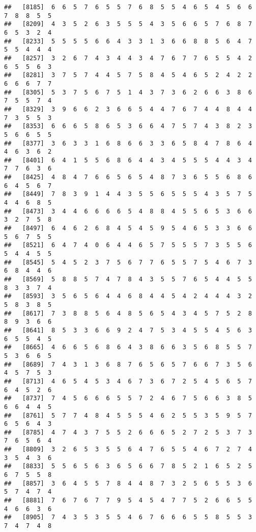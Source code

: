 \documentclass[
]{book}
\begin{document}
\begin{verbatim}
##   [8185]  6  6  5  7  6  5  5  7  6  8  5  5  4  6  5  4  5  6  6  7  8  8  5  5
##   [8209]  4  3  5  2  6  3  5  5  5  4  3  5  6  6  5  7  6  8  7  6  5  3  2  4
##   [8233]  5  5  5  5  6  6  4  3  3  1  3  6  6  8  8  5  6  4  7  5  5  4  4  4
##   [8257]  3  2  6  7  4  3  4  4  3  4  7  6  7  7  6  5  5  4  2  6  5  5  6  3
##   [8281]  3  7  5  7  4  4  5  7  5  8  4  5  4  6  5  2  4  2  2  6  6  6  7  7
##   [8305]  5  3  7  5  6  7  5  1  4  3  7  3  6  2  6  6  3  8  6  7  5  5  7  4
##   [8329]  3  9  6  6  2  3  6  6  5  4  4  7  6  7  4  4  8  4  4  7  3  5  5  3
##   [8353]  6  6  6  5  8  6  5  3  6  6  4  7  5  7  4  3  8  2  3  5  6  6  5  5
##   [8377]  3  6  3  3  1  6  8  6  6  3  3  6  5  8  4  7  8  6  4  4  6  3  6  2
##   [8401]  6  4  1  5  5  6  8  6  4  4  3  4  5  5  5  4  4  3  4  7  7  6  3  6
##   [8425]  4  8  4  7  6  6  5  6  5  4  8  7  3  6  5  5  6  8  6  6  4  5  6  7
##   [8449]  7  8  3  9  1  4  4  3  5  5  6  5  5  5  4  3  5  7  5  4  4  6  8  5
##   [8473]  3  4  4  6  6  6  6  5  4  8  8  4  5  5  6  5  3  6  6  3  2  7  5  8
##   [8497]  6  4  6  2  6  8  4  5  4  5  9  5  4  6  5  3  3  6  6  5  6  7  5  5
##   [8521]  6  4  7  4  0  6  4  4  6  5  7  5  5  5  7  3  5  5  6  5  4  4  5  5
##   [8545]  5  4  5  2  3  7  5  6  7  7  6  5  5  7  5  4  6  7  3  6  8  4  4  6
##   [8569]  5  8  8  5  7  4  7  8  4  3  5  5  7  6  5  4  4  5  5  8  3  3  7  4
##   [8593]  3  5  6  5  6  4  4  6  8  4  4  5  4  2  4  4  4  3  2  5  8  3  8  5
##   [8617]  7  3  8  8  5  6  4  8  5  6  5  4  3  4  5  7  5  2  8  8  9  3  6  6
##   [8641]  8  5  3  3  6  6  9  2  4  7  5  3  4  5  5  4  5  6  3  6  5  5  4  5
##   [8665]  4  6  6  5  6  8  6  4  3  8  6  6  3  5  6  8  5  5  7  5  3  6  6  5
##   [8689]  7  4  3  1  3  6  8  7  6  5  6  5  7  6  6  7  3  5  6  4  5  7  5  3
##   [8713]  4  6  5  4  5  3  4  6  7  3  6  7  2  5  4  5  6  5  7  6  4  5  2  6
##   [8737]  7  4  5  6  6  6  5  5  7  2  4  6  7  5  6  6  3  8  5  6  6  4  4  5
##   [8761]  5  7  7  4  8  4  5  5  5  4  6  2  5  5  3  5  9  5  7  6  5  6  4  3
##   [8785]  4  7  4  3  7  5  5  2  6  6  6  5  2  7  2  5  3  7  3  7  6  5  6  4
##   [8809]  3  2  6  5  3  5  5  6  4  7  6  5  5  4  6  7  2  7  4  3  5  4  3  6
##   [8833]  5  5  6  5  6  3  6  5  6  6  7  8  5  2  1  6  5  2  5  6  7  5  5  8
##   [8857]  3  6  4  5  5  7  8  4  4  8  7  3  2  5  6  5  5  3  6  5  7  4  7  4
##   [8881]  7  6  7  6  7  7  9  5  4  5  4  7  7  5  2  6  6  5  5  4  6  6  3  6
##   [8905]  7  4  3  5  3  5  5  4  6  7  6  6  6  5  5  8  5  5  3  7  4  7  4  8

\end{verbatim}
\end{document}
